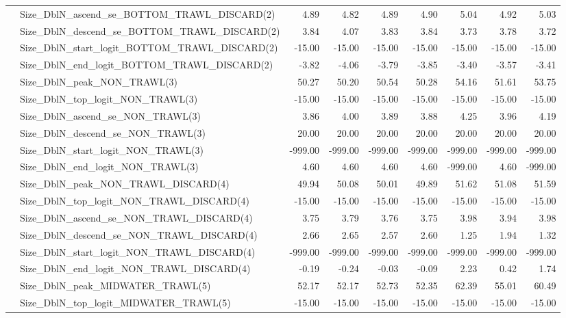 \documentclass[
]{scrartcl}
\begin{document}
\begin{landscape}
\begin{longtable}{llrrrrrrr}
 & Size\_DblN\_ascend\_se\_BOTTOM\_TRAWL\_DISCARD(2) & 4.89 & 4.82 & 4.89 & 4.90 & 5.04 & 4.92 & 5.03 \\ 
 & Size\_DblN\_descend\_se\_BOTTOM\_TRAWL\_DISCARD(2) & 3.84 & 4.07 & 3.83 & 3.84 & 3.73 & 3.78 & 3.72 \\ 
 & Size\_DblN\_start\_logit\_BOTTOM\_TRAWL\_DISCARD(2) & -15.00 & -15.00 & -15.00 & -15.00 & -15.00 & -15.00 & -15.00 \\ 
 & Size\_DblN\_end\_logit\_BOTTOM\_TRAWL\_DISCARD(2) & -3.82 & -4.06 & -3.79 & -3.85 & -3.40 & -3.57 & -3.41 \\ 
 & Size\_DblN\_peak\_NON\_TRAWL(3) & 50.27 & 50.20 & 50.54 & 50.28 & 54.16 & 51.61 & 53.75 \\ 
 & Size\_DblN\_top\_logit\_NON\_TRAWL(3) & -15.00 & -15.00 & -15.00 & -15.00 & -15.00 & -15.00 & -15.00 \\ 
 & Size\_DblN\_ascend\_se\_NON\_TRAWL(3) & 3.86 & 4.00 & 3.89 & 3.88 & 4.25 & 3.96 & 4.19 \\ 
 & Size\_DblN\_descend\_se\_NON\_TRAWL(3) & 20.00 & 20.00 & 20.00 & 20.00 & 20.00 & 20.00 & 20.00 \\ 
 & Size\_DblN\_start\_logit\_NON\_TRAWL(3) & -999.00 & -999.00 & -999.00 & -999.00 & -999.00 & -999.00 & -999.00 \\ 
 & Size\_DblN\_end\_logit\_NON\_TRAWL(3) & 4.60 & 4.60 & 4.60 & 4.60 & -999.00 & 4.60 & -999.00 \\ 
 & Size\_DblN\_peak\_NON\_TRAWL\_DISCARD(4) & 49.94 & 50.08 & 50.01 & 49.89 & 51.62 & 51.08 & 51.59 \\ 
 & Size\_DblN\_top\_logit\_NON\_TRAWL\_DISCARD(4) & -15.00 & -15.00 & -15.00 & -15.00 & -15.00 & -15.00 & -15.00 \\ 
 & Size\_DblN\_ascend\_se\_NON\_TRAWL\_DISCARD(4) & 3.75 & 3.79 & 3.76 & 3.75 & 3.98 & 3.94 & 3.98 \\ 
 & Size\_DblN\_descend\_se\_NON\_TRAWL\_DISCARD(4) & 2.66 & 2.65 & 2.57 & 2.60 & 1.25 & 1.94 & 1.32 \\ 
 & Size\_DblN\_start\_logit\_NON\_TRAWL\_DISCARD(4) & -999.00 & -999.00 & -999.00 & -999.00 & -999.00 & -999.00 & -999.00 \\ 
 & Size\_DblN\_end\_logit\_NON\_TRAWL\_DISCARD(4) & -0.19 & -0.24 & -0.03 & -0.09 & 2.23 & 0.42 & 1.74 \\ 
 & Size\_DblN\_peak\_MIDWATER\_TRAWL(5) & 52.17 & 52.17 & 52.73 & 52.35 & 62.39 & 55.01 & 60.49 \\ 
 & Size\_DblN\_top\_logit\_MIDWATER\_TRAWL(5) & -15.00 & -15.00 & -15.00 & -15.00 & -15.00 & -15.00 & -15.00 \\ 

\end{longtable}
\end{landscape}
\end{document}
